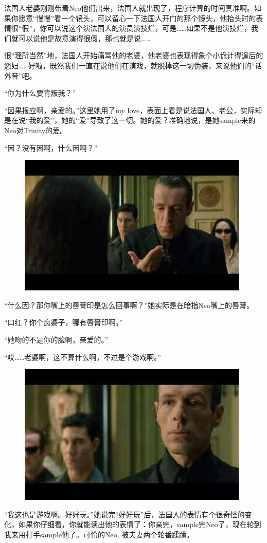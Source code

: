 \documentclass[UTF8]{ctexart}
\begin{document}
法国人老婆刚刚带着Neo他们出来，法国人就出现了，程序计算的时间真准啊。如果你愿意“慢慢”看一个镜头，可以留心一下法国人开门的那个镜头，他抬头时的表情很“假”，你可以说这个演法国人的演员演技烂，可是……如果不是他演技烂，我们就可以说他是故意演得很假，那也就是说……

很“理所当然”地，法国人开始痛骂他的老婆，他老婆也表现得象个小诡计得逞后的怨妇……好啦，既然我们一直在说他们在演戏，就脱掉这一切伪装，来说他们的“话外音”吧。

“你为什么要背叛我？”

“因果报应啊，亲爱的。”这里她用了my love，表面上看是说法国人、老公，实际却是在说“我的爱”，她的“爱”导致了这一切。她的爱？准确地说，是她sample来的Neo对Trinity的爱。

“因？没有因啊，什么因啊？”

\begin{figure}[htb]
\centering
\includegraphics[width=0.5\linewidth]{fig/read_reloaded-117}
\end{figure}

“什么因？那你嘴上的唇膏印是怎么回事啊？”她实际是在暗指Neo嘴上的唇膏。

“口红？你个疯婆子，哪有唇膏印啊。”

“她吻的不是你的脸啊，亲爱的。”

“哎……老婆啊，这不算什么啊，不过是个游戏啊。”

\begin{figure}[htb]
\centering
\includegraphics[width=0.5\linewidth]{fig/read_reloaded-118}
\end{figure}

“我这也是游戏啊。好好玩。”她说完“好好玩”后，法国人的表情有个很奇怪的变化，如果你仔细看，你就能读出他的表情了：你亲完，sample完Neo了，现在轮到我来用打手sample他了。可怜的Neo, 被夫妻两个轮番蹂躏。
\end{document}
